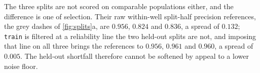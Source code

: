 The three splits are not scored on comparable populations either, and the
difference is one of selection. Their raw within-well split-half precision
references, the grey dashes of \cref{fig:splits}a, are $0.956$, $0.824$ and
$0.836$, a spread of $0.132$; \texttt{train}
is filtered at a reliability line the two held-out splits are not, and imposing
that line on all three brings the references to $0.956$, $0.961$ and $0.960$, a spread of $0.005$. The held-out shortfall therefore cannot be softened by appeal
to a lower noise floor.

